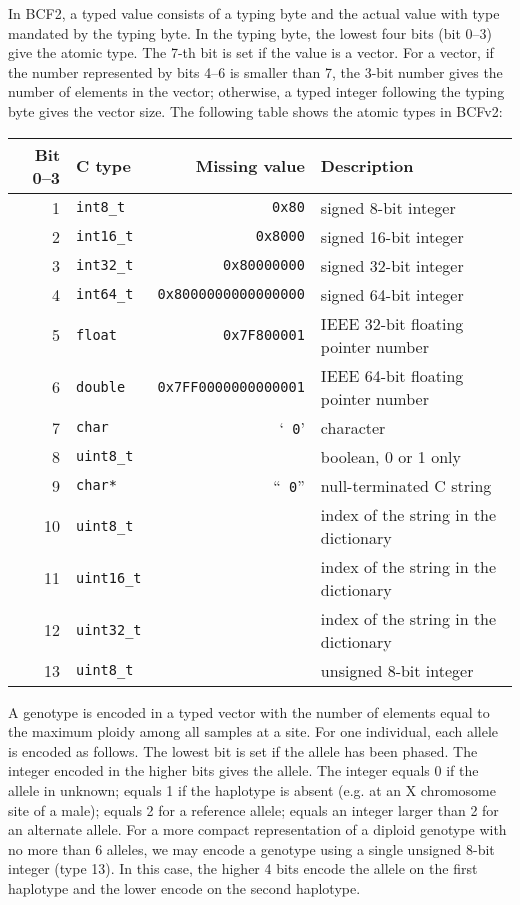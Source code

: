 \documentclass[10pt]{article}
\begin{document}
{\small
In BCF2, a typed value consists of a typing byte and the actual value with type
mandated by the typing byte. In the typing byte, the lowest four bits (bit
0--3) give the atomic type. The 7-th bit is set if the value is a vector. For a
vector, if the number represented by bits 4--6 is smaller than 7, the 3-bit
number gives the number of elements in the vector; otherwise, a typed integer
following the typing byte gives the vector size. The following table shows the
atomic types in BCFv2:
\begin{center}
{\small\begin{tabular}{rlrl}
\hline
Bit 0--3 & C type & Missing value & Description \\
\hline
1 & {\tt int8\_t}   & {\tt 0x80}               & signed 8-bit integer \\
2 & {\tt int16\_t}  & {\tt 0x8000}             & signed 16-bit integer \\
3 & {\tt int32\_t}  & {\tt 0x80000000}         & signed 32-bit integer \\
4 & {\tt int64\_t}  & {\tt 0x8000000000000000} & signed 64-bit integer \\
5 & {\tt float}     & {\tt 0x7F800001}         & IEEE 32-bit floating pointer number \\
6 & {\tt double}    & {\tt 0x7FF0000000000001} & IEEE 64-bit floating pointer number \\
7 & {\tt char}      & `{\tt \char92 0}'        & character \\
8 & {\tt uint8\_t}  &                    & boolean, 0 or 1 only \\
9 & {\tt char*}     & ``{\tt\char92 0}'' & null-terminated C string \\
10 & {\tt uint8\_t} &                    & index of the string in the dictionary \\
11 & {\tt uint16\_t}&                    & index of the string in the dictionary \\
12 & {\tt uint32\_t}&                    & index of the string in the dictionary \\
13 & {\tt uint8\_t} &                    & unsigned 8-bit integer \\
\hline
\end{tabular}}
\end{center}

A genotype is encoded in a typed vector with the number of elements equal to
the maximum ploidy among all samples at a site. For one individual, each allele
is encoded as follows. The lowest bit is set if the allele has been phased.
The integer encoded in the higher bits gives the allele. The integer equals
0 if the allele in unknown; equals 1 if the haplotype is absent (e.g. at an
X chromosome site of a male); equals 2 for a reference allele; equals an
integer larger than 2 for an alternate allele. For a more compact
representation of a diploid genotype with no more than 6 alleles, we may
encode a genotype using a single unsigned 8-bit integer (type 13). In this
case, the higher 4 bits encode the allele on the first haplotype and the lower
encode on the second haplotype.
}
\end{document}
